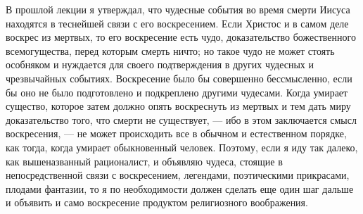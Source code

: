 \documentclass[12pt]{article}
\begin{document}
В прошлой лекции я утверждал, что чудесные события во время смерти Иисуса находятся в теснейшей связи с его воскресением. Если Христос и в самом деле воскрес из мертвых, то его воскресение есть чудо, доказательство божественного всемогущества, перед которым смерть ничто; но такое чудо не может стоять особняком и нуждается для своего подтверждения в других чудесных и чрезвычайных событиях. Воскресение было бы совершенно бессмысленно, если бы оно не было подготовлено и подкреплено другими чудесами. Когда умирает существо, которое затем должно опять воскреснуть из мертвых и тем дать миру доказательство того, что смерти не существует, --- ибо в этом заключается смысл воскресения, --- не может происходить все в обычном и естественном порядке, как тогда, когда умирает обыкновенный человек. Поэтому, если я иду так далеко, как вышеназванный рационалист, и объявляю чудеса, стоящие в непосредственной связи с воскресением, легендами, поэтическими прикрасами, плодами фантазии, то я по необходимости должен сделать еще один шаг дальше и объявить и само воскресение продуктом религиозного воображения. 
\end{document}
